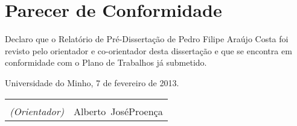 \documentclass[a4paper,abstract=on,parskip=full]{scrreprt}
\makeatletter
\newcommand{\role}[1]{\textit{(#1)}}
\newcommand{\advisor}{\role{Orientador}}
\newcommand{\coadvisor}{\role{Co-Advisor}}
\newcommand{\sigspace}[2]{%
  \begin{minipage}{\columnwidth}%
  \vspace{2cm}%
  \begin{tabular*}{\textwidth}{@{\extracolsep{\fill}}lr}%
  \hline \\ [-10pt]%
  {#1} & #2%
  \end{tabular*}%
  \end{minipage}%
}
\makeatother
\begin{document}
\chapter*{Parecer de Conformidade}

Declaro que o Relatório de Pré-Dissertação de Pedro Filipe Araújo Costa foi revisto pelo orientador e co-orientador desta dissertação e que se encontra em conformidade com o Plano de Trabalhos já submetido.

Universidade do Minho, 7 de fevereiro de 2013.

\setlength{\columnwidth}{10cm}
\sigspace{\advisor}{Alberto~JoséProença}\\

\thispagestyle{empty}
\end{document}
